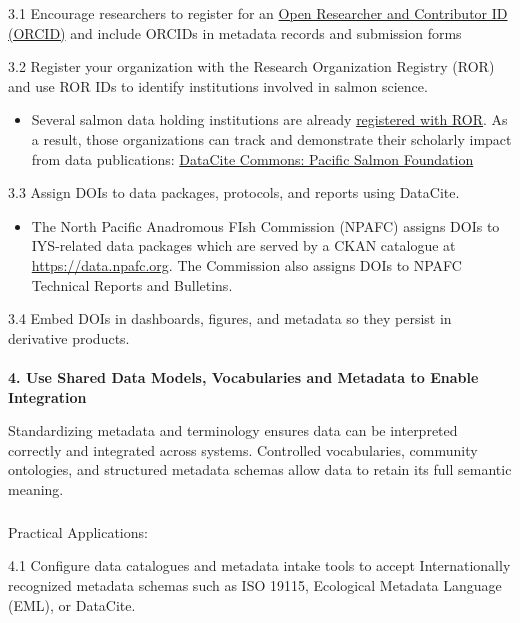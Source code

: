 \documentclass[
  letterpaper,
  DIV=11,
  numbers=noendperiod]{scrartcl}
\makeatletter
\let\oldparagraph\paragraph
\renewcommand{\paragraph}{
    \@ifstar
      \xxxParagraphStar
      \xxxParagraphNoStar
  }
\newcommand{\xxxParagraphStar}[1]{\oldparagraph*{#1}\mbox{}}
\newcommand{\xxxParagraphNoStar}[1]{\oldparagraph{#1}\mbox{}}
\let\oldsubparagraph\subparagraph
\renewcommand{\subparagraph}{
    \@ifstar
      \xxxSubParagraphStar
      \xxxSubParagraphNoStar
  }
\newcommand{\xxxSubParagraphStar}[1]{\oldsubparagraph*{#1}\mbox{}}
\newcommand{\xxxSubParagraphNoStar}[1]{\oldsubparagraph{#1}\mbox{}}
\providecommand{\tightlist}{%
  \setlength{\itemsep}{0pt}\setlength{\parskip}{0pt}}\usepackage{longtable,booktabs,array}
\makeatother
\begin{document}
3.1 Encourage researchers to register for an
\href{https://orcid.org/}{Open Researcher and Contributor ID (ORCID)}
and include ORCIDs in metadata records and submission forms

3.2 Register your organization with the Research Organization Registry
(ROR) and use ROR IDs to identify institutions involved in salmon
science.

\begin{itemize}
\tightlist
\item
  Several salmon data holding institutions are already
  \href{https://ror.org/search?page=1&query=salmon}{registered with
  ROR}. As a result, those organizations can track and demonstrate their
  scholarly impact from data publications:
  \href{https://commons.datacite.org/ror.org/04901nj56}{DataCite
  Commons: Pacific Salmon Foundation}
\end{itemize}

3.3 Assign DOIs to data packages, protocols, and reports using DataCite.

\begin{itemize}
\tightlist
\item
  The North Pacific Anadromous FIsh Commission (NPAFC) assigns DOIs to
  IYS-related data packages which are served by a CKAN catalogue at
  \url{https://data.npafc.org}. The Commission also assigns DOIs to
  NPAFC Technical Reports and Bulletins.
\end{itemize}

3.4 Embed DOIs in dashboards, figures, and metadata so they persist in
derivative products.

\paragraph{\texorpdfstring{\textbf{4. Use Shared Data Models,
Vocabularies and Metadata to Enable
Integration}}{4. Use Shared Data Models, Vocabularies and Metadata to Enable Integration}}\label{use-shared-data-models-vocabularies-and-metadata-to-enable-integration}

Standardizing metadata and terminology ensures data can be interpreted
correctly and integrated across systems. Controlled vocabularies,
community ontologies, and structured metadata schemas allow data to
retain its full semantic meaning.

\subparagraph{Practical Applications:}\label{practical-applications-3}

4.1 Configure data catalogues and metadata intake tools to accept
Internationally recognized metadata schemas such as ISO 19115,
Ecological Metadata Language (EML), or DataCite.
\end{document}
